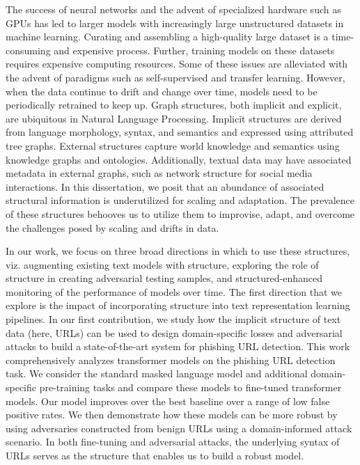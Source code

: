 
The success of neural networks and the advent of specialized hardware such as GPUs has led to larger models with increasingly large unstructured datasets in machine learning.
Curating and assembling a high-quality large dataset is a time-consuming and expensive process.
Further, training models on these datasets requires expensive computing resources.
Some of these issues are alleviated with the advent of paradigms such as self-supervised and transfer learning.
However, when the data continue to drift and change over time,
models need to be periodically retrained to keep up.
Graph structures, both implicit and explicit, are ubiquitous in Natural Language Processing.
Implicit structures are derived from language morphology, syntax, and semantics and expressed using attributed tree graphs.
External structures capture world knowledge and semantics using knowledge graphs and ontologies.
Additionally, textual data may have associated metadata in external graphs, such as network structure for social media interactions.
In this dissertation, we posit that an abundance of associated structural information is underutilized for scaling and adaptation.
The prevalence of these structures behooves us to utilize them to improvise, adapt, and overcome the challenges posed by scaling and drifts in data.

In our work, we focus on three broad directions in which to use these structures, viz. augmenting existing text models with structure, exploring the role of structure in creating adversarial testing samples, and structured-enhanced monitoring of the performance of models over time.
The first direction that we explore is the impact of incorporating structure into text representation learning pipelines.
In our first contribution, we study how the implicit structure of text data (here, URLs) can be used to design domain-specific losses and adversarial attacks to build a state-of-the-art system for phishing URL detection.
This work comprehensively analyzes transformer models on the phishing URL detection task.
We consider the standard masked language model and additional domain-specific pre-training tasks and compare these models to fine-tuned transformer models.
Our model improves over the best baseline over a range of low false positive rates.
We then demonstrate how these models can be more robust by using adversaries constructed from benign URLs using a domain-informed attack scenario. 
In both fine-tuning and adversarial attacks, the underlying syntax of URLs serves as the structure that enables us to build a robust model.



